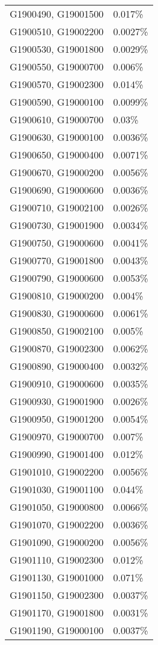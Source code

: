 \begin{longtable}[]{@{}ll@{}}
G1900490, G19001500 & 0.017\% \\
G1900510, G19002200 & 0.0027\% \\
G1900530, G19001800 & 0.0029\% \\
G1900550, G19000700 & 0.006\% \\
G1900570, G19002300 & 0.014\% \\
G1900590, G19000100 & 0.0099\% \\
G1900610, G19000700 & 0.03\% \\
G1900630, G19000100 & 0.0036\% \\
G1900650, G19000400 & 0.0071\% \\
G1900670, G19000200 & 0.0056\% \\
G1900690, G19000600 & 0.0036\% \\
G1900710, G19002100 & 0.0026\% \\
G1900730, G19001900 & 0.0034\% \\
G1900750, G19000600 & 0.0041\% \\
G1900770, G19001800 & 0.0043\% \\
G1900790, G19000600 & 0.0053\% \\
G1900810, G19000200 & 0.004\% \\
G1900830, G19000600 & 0.0061\% \\
G1900850, G19002100 & 0.005\% \\
G1900870, G19002300 & 0.0062\% \\
G1900890, G19000400 & 0.0032\% \\
G1900910, G19000600 & 0.0035\% \\
G1900930, G19001900 & 0.0026\% \\
G1900950, G19001200 & 0.0054\% \\
G1900970, G19000700 & 0.007\% \\
G1900990, G19001400 & 0.012\% \\
G1901010, G19002200 & 0.0056\% \\
G1901030, G19001100 & 0.044\% \\
G1901050, G19000800 & 0.0066\% \\
G1901070, G19002200 & 0.0036\% \\
G1901090, G19000200 & 0.0056\% \\
G1901110, G19002300 & 0.012\% \\
G1901130, G19001000 & 0.071\% \\
G1901150, G19002300 & 0.0037\% \\
G1901170, G19001800 & 0.0031\% \\
G1901190, G19000100 & 0.0037\% \\

\end{longtable}
